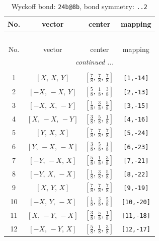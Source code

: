 \documentclass[fleqn,8pt]{jsarticle}
\begin{document}
\renewcommand{\arraystretch}{1.2}
\begin{longtable}{cccc}
\caption{Wyckoff bond: {\tt 24b@8b}, bond symmetry: {\tt ..2}}
 \\
 \hline \hline
No. & vector & center & mapping \\ \hline \endfirsthead

\multicolumn{3}{l}{\tablename\ \thetable{}} \\
 \hline \hline
No. & vector & center & mapping \\ \hline \endhead

 \hline \hline
\multicolumn{3}{r}{\footnotesize\it continued ...} \\ \endfoot

 \hline \hline
\multicolumn{3}{r}{} \\ \endlastfoot

1 & $\left[ X,\, X,\, Y \right]$ & $\left[ \frac{7}{8},\, \frac{7}{8},\, \frac{7}{8} \right]$ & {\tt [1,-14]} \\ \hline
2 & $\left[ - X,\, - X,\, Y \right]$ & $\left[ \frac{5}{8},\, \frac{1}{8},\, \frac{3}{8} \right]$ & {\tt [2,-13]} \\ \hline
3 & $\left[ - X,\, X,\, - Y \right]$ & $\left[ \frac{1}{8},\, \frac{3}{8},\, \frac{5}{8} \right]$ & {\tt [3,-15]} \\ \hline
4 & $\left[ X,\, - X,\, - Y \right]$ & $\left[ \frac{3}{8},\, \frac{5}{8},\, \frac{1}{8} \right]$ & {\tt [4,-16]} \\ \hline
5 & $\left[ Y,\, X,\, X \right]$ & $\left[ \frac{7}{8},\, \frac{7}{8},\, \frac{7}{8} \right]$ & {\tt [5,-24]} \\ \hline
6 & $\left[ Y,\, - X,\, - X \right]$ & $\left[ \frac{3}{8},\, \frac{5}{8},\, \frac{1}{8} \right]$ & {\tt [6,-23]} \\ \hline
7 & $\left[ - Y,\, - X,\, X \right]$ & $\left[ \frac{5}{8},\, \frac{1}{8},\, \frac{3}{8} \right]$ & {\tt [7,-21]} \\ \hline
8 & $\left[ - Y,\, X,\, - X \right]$ & $\left[ \frac{1}{8},\, \frac{3}{8},\, \frac{5}{8} \right]$ & {\tt [8,-22]} \\ \hline
9 & $\left[ X,\, Y,\, X \right]$ & $\left[ \frac{7}{8},\, \frac{7}{8},\, \frac{7}{8} \right]$ & {\tt [9,-19]} \\ \hline
10 & $\left[ - X,\, Y,\, - X \right]$ & $\left[ \frac{1}{8},\, \frac{3}{8},\, \frac{5}{8} \right]$ & {\tt [10,-20]} \\ \hline
11 & $\left[ X,\, - Y,\, - X \right]$ & $\left[ \frac{3}{8},\, \frac{5}{8},\, \frac{1}{8} \right]$ & {\tt [11,-18]} \\ \hline
12 & $\left[ - X,\, - Y,\, X \right]$ & $\left[ \frac{5}{8},\, \frac{1}{8},\, \frac{3}{8} \right]$ & {\tt [12,-17]} \\
\end{longtable}
\end{document}
